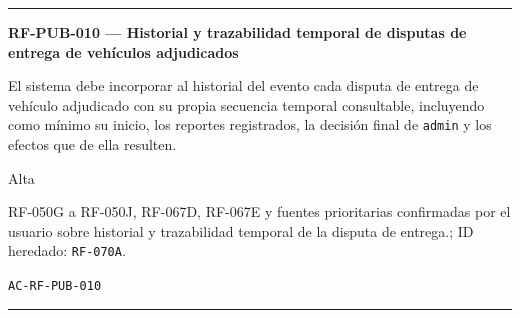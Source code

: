 \documentclass[10pt,letterpaper]{article}
\begin{document}
\vspace{0.25em}\hrule\vspace{0.65em}
\noindent\textbf{RF-PUB-010 --- Historial y trazabilidad temporal de disputas de entrega de vehículos adjudicados}\par
\begin{description}[style=nextline,leftmargin=3.15cm,labelwidth=2.8cm,font=\normalfont\bfseries]
\item[Obligación] El sistema debe incorporar al historial del evento cada disputa de entrega de vehículo adjudicado con su propia secuencia temporal consultable, incluyendo como mínimo su inicio, los reportes registrados, la decisión final de \texttt{admin} y los efectos que de ella resulten.
\item[Prioridad] Alta
\item[Procedencia] RF-050G a RF-050J, RF-067D, RF-067E y fuentes prioritarias confirmadas por el usuario sobre historial y trazabilidad temporal de la disputa de entrega.; ID heredado: \texttt{RF-070A}.
\item[Verificación] \texttt{AC-RF-PUB-010}
\end{description}
\vspace{0.25em}\hrule\vspace{0.65em}
\end{document}
